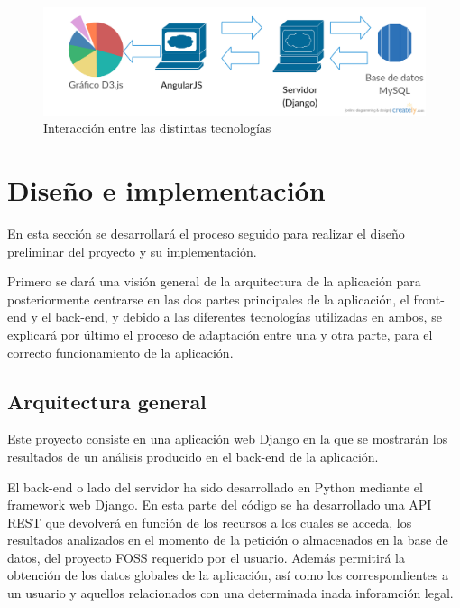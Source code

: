 \documentclass[a4paper, spanish, 12pt]{book}
\begin{document}
\begin{figure}[H]
    \centering
    \includegraphics[width=12cm, keepaspectratio]{img/technologies-interaction}
    \caption{Interacci\'on entre las distintas tecnolog\'ias}
    \label{fig:interaction}
\end{figure}



\cleardoublepage
\chapter{Dise\~no e implementaci\'on}

En esta secci\'on se desarrollar\'a el proceso seguido para realizar el dise\~no
preliminar del proyecto y su implementaci\'on.

Primero se dar\'a una visi\'on general de la arquitectura de la aplicaci\'on para
posteriormente centrarse en las dos partes principales de la aplicaci\'on, el front-end
y el back-end, y debido a las diferentes tecnolog\'ias utilizadas en ambos, se
explicar\'a por \'ultimo el proceso de adaptaci\'on entre una y otra parte, para
el correcto funcionamiento de la aplicaci\'on.

\section{Arquitectura general}
\label{sec:arquitectura}

Este proyecto consiste en una aplicaci\'on web Django en la que se mostrar\'an los resultados
de un an\'alisis producido en el back-end de la aplicaci\'on.

El back-end o lado del servidor ha sido desarrollado en Python mediante el framework
web Django. En esta parte del c\'odigo se ha desarrollado una API REST que devolver\'a
en funci\'on de los recursos a los cuales se acceda, los resultados analizados en el
momento de la petici\'on o almacenados en la base de datos, del proyecto FOSS requerido
por el usuario. Adem\'as permitir\'a la obtenci\'on de los datos globales de la aplicaci\'on,
as\'i como los correspondientes a un usuario y aquellos relacionados con una determinada
inada
inforamci\'on legal.
\end{document}
